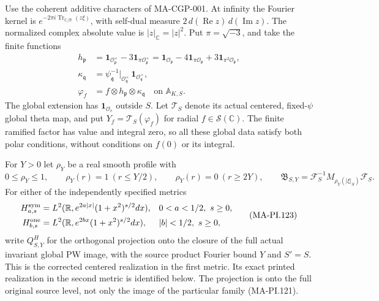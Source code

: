 Use the coherent additive characters of MA-CGP-001.
At infinity the Fourier kernel is
$e^{-2\pi i\operatorname{Tr}_{\mathbb C/\mathbb R}(z\xi)}$,
with self-dual measure $2\,d(\operatorname{Re}z)\,d(\operatorname{Im}z)$.
The normalized complex absolute value is $|z|_{\mathbb C}=|z|^2$.
Put $\pi=\sqrt{-3}$, and take the finite functions
\[
 \begin{split}
 h_{\mathfrak p}
   &=\mathbf1_{\mathcal O_{\mathfrak p}^{\times}}
            -3\mathbf1_{\pi\mathcal O_{\mathfrak p}^{\times}}
     =\mathbf1_{\mathcal O_{\mathfrak p}}
            -4\mathbf1_{\pi\mathcal O_{\mathfrak p}}
            +3\mathbf1_{\pi^2\mathcal O_{\mathfrak p}},\\
 \kappa_{\mathfrak q}
   &=\psi_{\mathfrak q}^{-1}|_{\mathcal O_{\mathfrak q}^{\times}}\,
                             \mathbf1_{\mathcal O_{\mathfrak q}^{\times}},\\
 \varphi_f&=f\otimes h_{\mathfrak p}\otimes\kappa_{\mathfrak q}
                    \quad\text{on }\mathbb A_{K,S}.
 \end{split}
 \tag{MA-PI.121}
\]
The global extension has $\mathbf1_{\mathcal O_v}$ outside $S$.
Let $\mathcal T_S$ denote its actual centered, fixed-$\psi$
global theta map, and put
$Y_f=\mathcal T_S(\varphi_f)$ for radial $f\in\mathcal S(\mathbb C)$.
The finite ramified factor has value and integral zero,
so all these global data satisfy both polar conditions,
without conditions on $f(0)$ or its integral.

For $Y>0$ let $\rho_Y$ be a real smooth profile with
\[
 0\le\rho_Y\le1,\qquad
 \rho_Y(r)=1\ (r\le Y/2),\qquad
 \rho_Y(r)=0\ (r\ge2Y),\qquad
 \mathfrak B_{S,Y}
      =\mathcal F_S^{-1}M_{\rho_Y(|\xi|_S)}\mathcal F_S.
 \tag{MA-PI.122}
\]
For either of the independently specified metrics
\[
 \begin{aligned}
 H^{\rm sym}_{a,s}
    &=L^2(\mathbb R,e^{2a|x|}(1+x^2)^{s/2}dx),
                 &&0<a<1/2,\ s\ge0,\\
 H^{\rm one}_{b,s}
    &=L^2(\mathbb R,e^{2bx}(1+x^2)^{s/2}dx),
                 &&|b|<1/2,\ s\ge0,
 \end{aligned}
 \tag{MA-PI.123}
\]
write $Q^H_{S,Y}$ for the orthogonal projection onto the
closure of the full actual invariant global PW image,
with the source product Fourier bound $Y$ and $S'=S$.
This is the corrected centered realization in the first
metric.  Its exact printed realization in the second
metric is identified below.  The projection is onto the
full original source level, not only the image of the
particular family (MA-PI.121).

